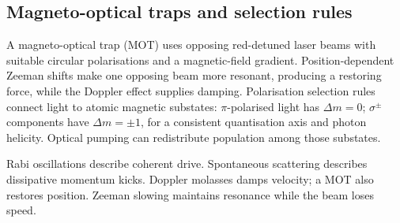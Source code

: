 \subsection{Magneto-optical traps and selection rules}
A magneto-optical trap (MOT) uses
opposing red-detuned laser beams
with suitable circular polarisations
and a magnetic-field gradient.
Position-dependent Zeeman shifts
make one opposing beam more resonant,
producing a restoring force, while the
Doppler effect supplies damping.
Polarisation selection rules connect
light to atomic magnetic substates:
\(\pi\)-polarised light has \(\Delta m=0\);
\(\sigma^\pm\) components have
\(\Delta m=\pm1\), for a consistent
quantisation axis and photon helicity.
Optical pumping can redistribute
population among those substates.

\begin{checkpoint}
Rabi oscillations describe coherent drive.
Spontaneous scattering describes dissipative
momentum kicks. Doppler molasses damps
velocity; a MOT also restores position.
Zeeman slowing maintains resonance
while the beam loses speed.
\end{checkpoint}
